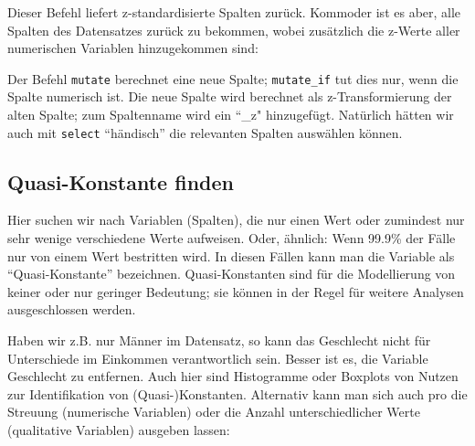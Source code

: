 \documentclass[12pt,ngerman,]{book}
\makeatletter
\newenvironment{Shaded}{\begin{snugshade}}{\end{snugshade}}
\newcommand{\KeywordTok}[1]{\textcolor[rgb]{0.13,0.29,0.53}{\textbf{{#1}}}}
\newcommand{\DataTypeTok}[1]{\textcolor[rgb]{0.13,0.29,0.53}{{#1}}}
\newcommand{\StringTok}[1]{\textcolor[rgb]{0.31,0.60,0.02}{{#1}}}
\newcommand{\CommentTok}[1]{\textcolor[rgb]{0.56,0.35,0.01}{\textit{{#1}}}}
\newcommand{\OtherTok}[1]{\textcolor[rgb]{0.56,0.35,0.01}{{#1}}}
\newcommand{\NormalTok}[1]{{#1}}
\newenvironment{kframe}{%
\medskip{}
\setlength{\fboxsep}{.8em}
 \def\at@end@of@kframe{}%
 \ifinner\ifhmode%
  \def\at@end@of@kframe{\end{minipage}}%
  \begin{minipage}{\columnwidth}%
 \fi\fi%
 \def\FrameCommand##1{\hskip\@totalleftmargin \hskip-\fboxsep
 \colorbox{shadecolor}{##1}\hskip-\fboxsep
     \hskip-\linewidth \hskip-\@totalleftmargin \hskip\columnwidth}%
 \MakeFramed {\advance\hsize-\width
   \@totalleftmargin\z@ \linewidth\hsize
   \@setminipage}}%
 {\par\unskip\endMakeFramed%
 \at@end@of@kframe}
\renewenvironment{Shaded}{\begin{kframe}}{\end{kframe}}
\theoremstyle{definition}
\theoremstyle{definition}
\theoremstyle{remark}
\makeatother
\begin{document}
Dieser Befehl liefert z-standardisierte Spalten zurück. Kommoder ist es
aber, alle Spalten des Datensatzes zurück zu bekommen, wobei zusätzlich
die z-Werte aller numerischen Variablen hinzugekommen sind:

\begin{Shaded}
\end{Shaded}

Der Befehl \texttt{mutate} berechnet eine neue Spalte;
\texttt{mutate\_if} tut dies nur, wenn die Spalte numerisch ist. Die
neue Spalte wird berechnet als z-Transformierung der alten Spalte; zum
Spaltenname wird ein ``\_z" hinzugefügt. Natürlich hätten wir auch mit
\texttt{select} ``händisch'' die relevanten Spalten auswählen können.

\subsection{Quasi-Konstante finden}\label{quasi-konstante-finden}

Hier suchen wir nach Variablen (Spalten), die nur einen Wert oder
zumindest nur sehr wenige verschiedene Werte aufweisen. Oder, ähnlich:
Wenn 99.9\% der Fälle nur von einem Wert bestritten wird. In diesen
Fällen kann man die Variable als ``Quasi-Konstante'' bezeichnen.
Quasi-Konstanten sind für die Modellierung von keiner oder nur geringer
Bedeutung; sie können in der Regel für weitere Analysen ausgeschlossen
werden.

Haben wir z.B. nur Männer im Datensatz, so kann das Geschlecht nicht für
Unterschiede im Einkommen verantwortlich sein. Besser ist es, die
Variable Geschlecht zu entfernen. Auch hier sind Histogramme oder
Boxplots von Nutzen zur Identifikation von (Quasi-)Konstanten.
Alternativ kann man sich auch pro die Streuung (numerische Variablen)
oder die Anzahl unterschiedlicher Werte (qualitative Variablen) ausgeben
lassen:

\begin{Shaded}
\end{Shaded}
\end{document}
